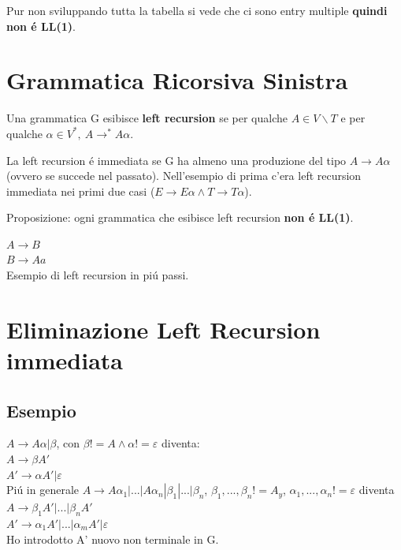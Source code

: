 Pur non sviluppando tutta la tabella si vede che ci sono entry multiple \textbf{quindi non \'e LL(1)}.

\section{Grammatica Ricorsiva Sinistra}
Una grammatica G esibisce \textbf{left recursion} se per qualche $A \in V \backslash T$ e per qualche 
$\alpha \in V^*,\ A \rightarrow ^* A\alpha $.

La left recursion \'e immediata se G ha almeno una produzione del tipo $A \rightarrow A \alpha$ (ovvero se succede nel passato).
Nell'esempio di prima c'era left recursion immediata nei primi due casi ($E \rightarrow E\alpha \land T \rightarrow T\alpha $).

\begin{tcolorbox}\begin{center}
    Proposizione: ogni grammatica che esibisce left recursion \textbf{non \'e LL(1)}.
\end{center}\end{tcolorbox}

$A \rightarrow B$\\
$B \rightarrow Aa$\\
Esempio di left recursion in pi\'u passi.

\section{Eliminazione Left Recursion immediata}

\subsection{Esempio}
$A \rightarrow A \alpha | \beta $, con $\beta != A \land \alpha != \varepsilon$ diventa:\\
$A \rightarrow \beta A'$\\
$A' \rightarrow \alpha A' | \varepsilon$\\

Pi\'u in generale
$A \rightarrow A\alpha _1 | ... | A\alpha _n | \beta _1 | ... | \beta _n $, $\beta _1, ..., \beta _n != A_y$, 
$\alpha_1,...,\alpha_n != \varepsilon$ diventa\\
$A \rightarrow \beta _1 A'|...|\beta _n A' $\\
$A' \rightarrow \alpha _1 A'|...|\alpha _m A' | \varepsilon $\\
Ho introdotto A' nuovo non terminale in G.

